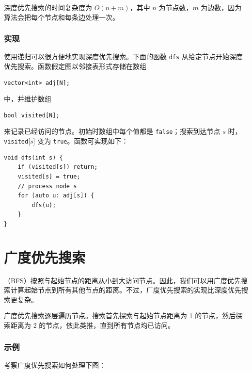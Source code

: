 深度优先搜索的时间复杂度为 $O(n+m)$，其中 $n$ 为节点数，$m$ 为边数，因为算法会把每个节点和每条边处理一次。

\subsubsection*{实现}

使用递归可以很方便地实现深度优先搜索。下面的函数 \texttt{dfs} 从给定节点开始深度优先搜索。函数假定图以邻接表形式存储在数组
\begin{lstlisting}
vector<int> adj[N];
\end{lstlisting}
中，并维护数组
\begin{lstlisting}
bool visited[N];
\end{lstlisting}
来记录已经访问的节点。初始时数组中每个值都是 \texttt{false}；搜索到达节点 $s$ 时，\texttt{visited}[$s$] 变为 \texttt{true}。函数可实现如下：
\begin{lstlisting}
void dfs(int s) {
    if (visited[s]) return;
    visited[s] = true;
    // process node s
    for (auto u: adj[s]) {
        dfs(u);
    }
}
\end{lstlisting}

\section{广度优先搜索}


（BFS）按照与起始节点的距离从小到大访问节点。因此，我们可以用广度优先搜索计算起始节点到所有其他节点的距离。不过，广度优先搜索的实现比深度优先搜索更复杂。

广度优先搜索逐层遍历节点。搜索首先探索与起始节点距离为 1 的节点，然后探索距离为 2 的节点，依此类推，直到所有节点均已访问。

\subsubsection*{示例}

考察广度优先搜索如何处理下图：

